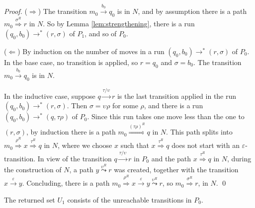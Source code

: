 \documentclass{llncs}
\newcommand{\eps}{\ensuremath{\varepsilon}}
\begin{document}
\begin{proof}
($\Rightarrow$)
The transition $m_0\stackrel{b_0}{\rightarrow}q_0$ is in $N$, and by assumption there is a path $m_0\stackrel{\sigma^R}{\Rightarrow}r$ in $N$.
So by Lemma \ref{lem:strengthening}, there is a run $(q_0,b_0)\rightarrow^*(r,\sigma)$ of $P_1$, and so of $P_0$.

\vspace{2mm}

\noindent
($\Leftarrow$) By induction on the number of moves in a run $(q_0,b_0)\rightarrow^*(r,\sigma)$ of $P_0$.
In the base case, no transition is applied, so $r=q_0$ and $\sigma=b_0$.
The transition $m_0\stackrel{b_0}{\rightarrow}q_0$ is in $N$.

In the inductive case, suppose $q\stackrel{\tau/\upsilon}{\rightarrow}r$ is the last transition applied in the run $(q_0,b_0)\rightarrow^*(r,\sigma)$.
Then $\sigma=\upsilon\rho$ for some $\rho$, and there is a run $(q_0,b_0)\rightarrow^*(q,\tau\rho)$ of $P_0$. Since this run
takes one move less than the one to $(r,\sigma)$, by induction there is a path $m_0\!\!\stackrel{(\tau\rho)^R}{\Rightarrow}\!\!q$ in $N$.
This path splits into $m_0\stackrel{\rho^R}{\Rightarrow}x\stackrel{\tau^R}{\Rightarrow}q$ in $N$, where we choose $x$ such that
$x\stackrel{\tau^R}{\Rightarrow}q$ does not start with an $\eps$-transition.
In view of the transition $q\stackrel{\tau/\upsilon}{\rightarrow}r$ in $P_0$ and the path $x\stackrel{\tau^R}{\Rightarrow}q$ in $N$,
during the construction of $N$, a path $y\stackrel{\upsilon^R}{\leadsto}r$ was created, together with
the transition $x\stackrel{\eps}{\rightarrow}y$. Concluding, there is a path $m_0\stackrel{\rho^R}{\Rightarrow}x\stackrel{\eps}{\rightarrow}y\stackrel{\upsilon^R}{\leadsto}r$,
so $m_0\stackrel{\sigma^R}{\Rightarrow}r$, in $N$.
\qed
\end{proof}

\begin{theorem}
\label{thm:nfa1}
The returned set $U_1$ consists of the unreachable transitions in $P_0$.
\end{theorem}
\end{document}
